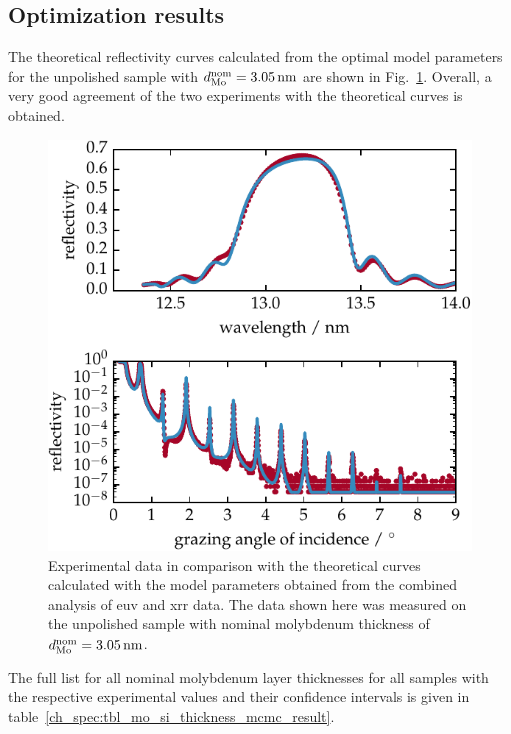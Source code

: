 \subsection{Optimization results} \label{ch_spec:sec_mo_si_c_results}
The theoretical reflectivity curves calculated from the optimal model parameters for the unpolished sample with $d_\text{Mo}^\text{nom} = \nm{3.05}$ are shown in Fig.~\ref{ch_spec:fig_EUV_XRR_combined}. Overall, a very good agreement of the two experiments with the theoretical curves is obtained.
\begin{figure}[htbp]
\centering
\includegraphics{img/PS5657}
\caption{Experimental data in comparison with the theoretical curves calculated with the model parameters obtained from the combined analysis of \gls{euv} and \gls{xrr} data. The data shown here was measured on the unpolished sample with nominal molybdenum thickness of $d_\text{Mo}^\text{nom} = \nm{3.05}$.}
\label{ch_spec:fig_EUV_XRR_combined}
\end{figure}
The full list for all nominal molybdenum layer thicknesses for all samples with the respective experimental values and their confidence intervals is given in table~\ref{ch_spec:tbl_mo_si_thickness_mcmc_result}.
